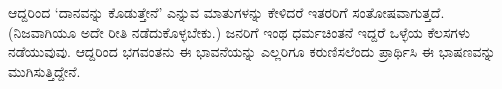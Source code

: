 ಆದ್ದರಿಂದ `ದಾನವನ್ನು ಕೊಡುತ್ತೇನೆ' ಎನ್ನುವ ಮಾತುಗಳನ್ನು ಕೇಳಿದರೆ ಇತರರಿಗೆ ಸಂತೋಷವಾಗುತ್ತದೆ.‌ (ನಿಜವಾಗಿಯೂ ಅದೇ ರೀತಿ ನಡೆದುಕೊಳ್ಳಬೇಕು.) ಜನರಿಗೆ ಇಂಥ ಧರ್ಮಚಿಂತನೆ ಇದ್ದರೆ ಒಳ್ಳೆಯ ಕೆಲಸಗಳು ನಡೆಯುವುವು. ಆದ್ದರಿಂದ ಭಗವಂತನು ಈ ಭಾವನೆಯನ್ನು ಎಲ್ಲರಿಗೂ ಕರುಣಿಸಲೆಂದು ಪ್ರಾರ್ಥಿಸಿ ಈ ಭಾಷಣವನ್ನು ಮುಗಿಸುತ್ತಿದ್ದೇನೆ.
















































































